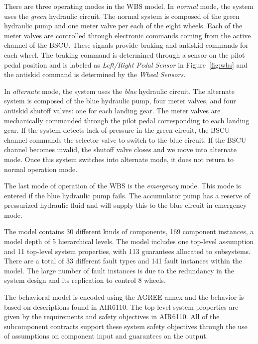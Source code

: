 There are three operating modes in the WBS model. In \textit{normal} mode, the system uses the \textit{green} hydraulic circuit. The normal system is composed of the green hydraulic pump and one meter valve per each of the eight wheels. Each of the meter valves are controlled through electronic commands coming from the active channel of the BSCU. These signals provide braking and antiskid commands for each wheel. The braking command is determined through a sensor on the pilot pedal position and is labeled as \textit{Left/Right Pedal Sensor} in Figure~\ref{fig:wbs} and the antiskid command is determined by the \textit{Wheel Sensors}. 

In \textit{alternate} mode, the system uses the \textit{blue} hydraulic circuit. The alternate system is composed of the blue hydraulic pump, four meter valves, and four antiskid shutoff valves: one for each landing gear. The meter valves are mechanically commanded through the pilot pedal corresponding to each landing gear. If the system detects lack of pressure in the green circuit, the BSCU channel commands the selector valve to switch to the blue circuit. %
If the BSCU channel becomes invalid, the shutoff valve closes and we move into alternate mode. Once this system switches into alternate mode, it does not return to normal operation mode.

The last mode of operation of the WBS is the \textit{emergency} mode. This mode is entered if the blue hydraulic pump fails. The accumulator pump has a reserve of pressurized hydraulic fluid and will supply this to the blue circuit in emergency mode.


The model contains 30 different kinds of components, 169 component instances, a model depth of 5 hierarchical levels.  The model includes one top-level assumption and  11 top-level system properties, with 113 guarantees allocated to subsystems.  There are a total of 33 different fault types and 141 fault instances within the model.  The large number of fault instances is due to the redundancy in the system design and its replication to control 8 wheels.

The behavioral model is encoded using the AGREE annex and the behavior is based on descriptions found in AIR6110. The top level system properties are given by the requirements and safety objectives in AIR6110. All of the subcomponent contracts support these system safety objectives through the use of assumptions on component input and guarantees on the output.

